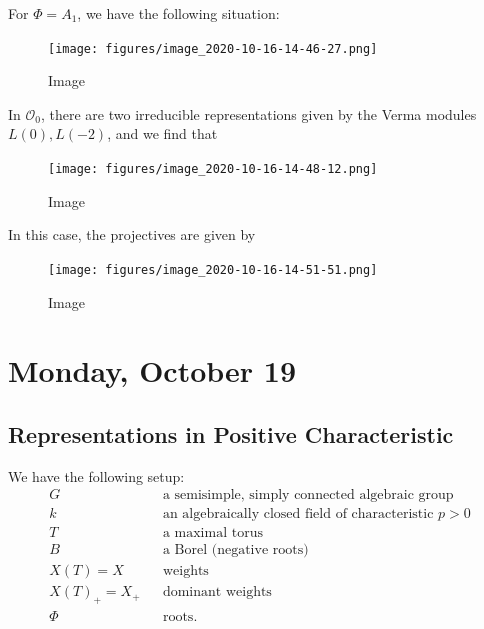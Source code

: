 \begin{example}

\begin{example}

For \(\Phi = A_1\), we have the following situation:

\begin{figure}
\centering
\texttt{[image: figures/image\_2020-10-16-14-46-27.png]}
\caption{Image}
\end{figure}

In \({\mathcal{O}}_0\), there are two irreducible representations given
by the Verma modules \(L(0), L(-2)\), and we find that

\begin{figure}
\centering
\texttt{[image: figures/image\_2020-10-16-14-48-12.png]}
\caption{Image}
\end{figure}

In this case, the projectives are given by

\begin{figure}
\centering
\texttt{[image: figures/image\_2020-10-16-14-51-51.png]}
\caption{Image}
\end{figure}

\end{example}

\end{example}

\hypertarget{monday-october-19}{%
\section{Monday, October 19}\label{monday-october-19}}


\hypertarget{representations-in-positive-characteristic}{%
\subsection{Representations in Positive
Characteristic}\label{representations-in-positive-characteristic}}

We have the following setup:
\begin{align*}   G && \text{a semisimple, simply connected algebraic group} \\ k && \text{an algebraically closed field of characteristic $p>0$} \\ T && \text{a maximal torus} \\ B && \text{a Borel (negative roots)} \\ X(T) = X && \text{weights} \\ X(T)_+ = X_+ && \text{dominant weights} \\ \Phi && \text{roots} .\end{align*}

